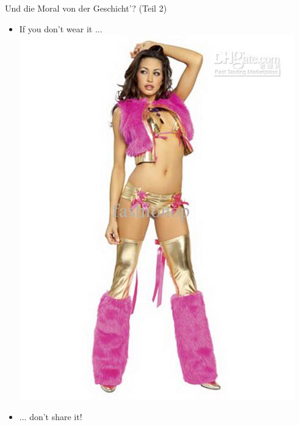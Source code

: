 \begin{frame}
	Und die Moral von der Geschicht'? (Teil 2) \\
	\begin{itemize}
	\item	<1->If you don't wear it ...
		\includegraphics[scale=0.3]{socialmedia-memes/wear.jpg}
	\item <2->... don't share it!
	\end{itemize}
\end{frame}